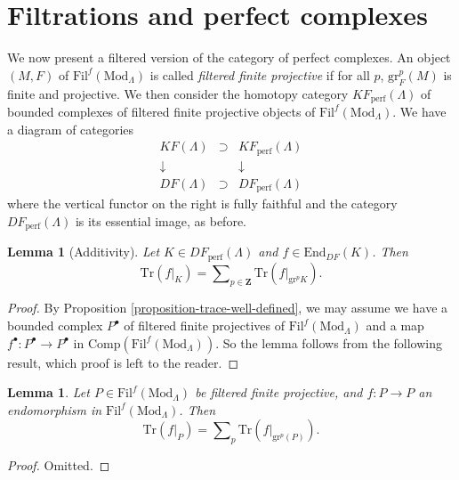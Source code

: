 \documentclass{stacks-project}
\theoremstyle{plain}
\newtheorem{lemma}[subsection]{Lemma}
\theoremstyle{definition}
\theoremstyle{remark}
\numberwithin{equation}{subsection}
\begin{document}
\section{Filtrations and perfect complexes}
\label{section-filtrations-perfect}

\noindent
We now present a filtered version of the category of perfect complexes. An
object $(M, F)$ of $\text{Fil}^f(\text{Mod}_\Lambda)$ is called {\it filtered
finite projective} if for all $p$, $\text{gr}^p_F (M)$ is finite and
projective. We then consider the homotopy category
$KF_{\text{perf}}(\Lambda)$ of bounded complexes of filtered finite
projective objects of $\text{Fil}^f(\text{Mod}_\Lambda)$. We have a diagram of
categories
$$
\begin{matrix}
KF(\Lambda) & \supset & KF_{\text{perf}}(\Lambda)\\
\downarrow & & \downarrow\\
DF(\Lambda) & \supset & DF_{\text{perf}}(\Lambda)
\end{matrix}
$$
where the vertical functor on the right is fully faithful and the category
$DF_{\text{perf}}(\Lambda)$ is its essential image, as before.

\begin{lemma}[Additivity]
\label{lemma-additivity}
Let $K\in DF_{\text{perf}}(\Lambda)$ and $f\in
\text{End}_{DF}(K)$. Then
$$
\text{Tr}(f|_K) =
\sum\nolimits_{p\in \mathbf{Z}} \text{Tr}(f|_{\text{gr}^p K}).
$$
\end{lemma}

\begin{proof}
By Proposition \ref{proposition-trace-well-defined}, we may assume we have
a bounded
complex $P^\bullet$ of filtered finite projectives of
$\text{Fil}^f(\text{Mod}_\Lambda)$ and a map $f^\bullet : P^\bullet\to
P^\bullet$ in $\text{Comp}(\text{Fil}^f(\text{Mod}_\Lambda))$. So the lemma
follows from the following result, which proof is left to the reader.
\end{proof}

\begin{lemma}
\label{lemma-additive-filtered-finite-projective}
Let $P \in \text{Fil}^f(\text{Mod}_\Lambda)$ be filtered finite projective, and
$f : P \to P$ an endomorphism in $\text{Fil}^f(\text{Mod}_\Lambda)$. Then
$$
\text{Tr}(f|_P) =
\sum\nolimits_p \text{Tr}(f|_{\text{gr}^p(P)}).
$$
\end{lemma}

\begin{proof}
Omitted.
\end{proof}
\end{document}
